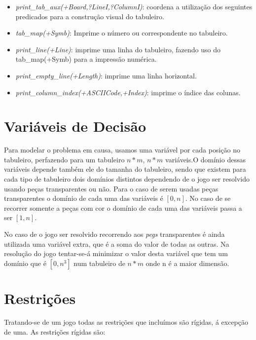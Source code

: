 \documentclass{llncs}
\begin{document}
\begin{itemize}
\item \textit{print\_tab\_aux(+Board,?LineI,?ColumnI)}: coordena a utiliza\c{c}\~{a}o dos seguintes predicados para a constru\c{c}\~{a}o visual do tabuleiro.
\item \textit{tab\_map(+Symb)}: Imprime o n\'{u}mero ou correspondente no tabuleiro.
\item \textit{print\_line(+Line)}: imprime uma linha do tabuleiro, fazendo uso do tab\_map(+Symb) para a impress\~{a}o num\'{e}rica.
\item \textit{print\_empty\_line(+Length)}: imprime uma linha horizontal.
\item \textit{print\_column\_index(+ASCIICode,+Index)}: imprime o \'{i}ndice das colunas.
\end{itemize}

\section{Vari\'{a}veis de Decis\~{a}o}

Para modelar o problema em causa, usamos uma vari\'{a}vel por cada posi\c{c}\~{a}o no tabuleiro, perfazendo para um tabuleiro $n * m$, $n * m$ vari\'{a}veis.O dom\'{i}nio dessas vari\'{a}veis depende tamb\'{e}m ele do tamanha do tabuleiro, sendo que existem para cada tipo de tabuleiro dois dom\'{i}nios distintos dependendo de o jogo ser resolvido usando pe\c{c}as transparentes ou n\~{a}o.
Para o caso de serem usadas pe\c{c}as transparentes o dom\'{i}nio de cada uma das vari\'{a}veis \'{e} $[0,n]$.
No caso de se recorrer somente a pe\c{c}as com cor o dom\'{i}nio de cada uma das vari\'{a}veis passa a ser $[1,n]$.

No caso de o jogo ser resolvido recorrendo aos \emph{pegs} transparentes \'{e} ainda utilizada uma vari\'{a}vel extra, que \'{e} a soma do valor de todas as outras. Na resoluç\~{a}o do jogo tentar-se-\'{a} minimizar o valor desta vari\'{a}vel que tem um dom\'{i}nio que \'{e} $[0,n^3]$ num tabuleiro de $n * m$ onde n \'{e} a maior dimens\~{a}o. 

\section{Restri\c{c}\~{o}es}

Tratando-se de um jogo todas as restri\c{c}\~{o}es que inclu\'{i}mos s\~{a}o r\'{i}gidas, \'{a} excep\c{c}\~{a}o de uma.
As restri\c{c}\~{o}es r\'{i}gidas s\~{a}o:
\end{document}
